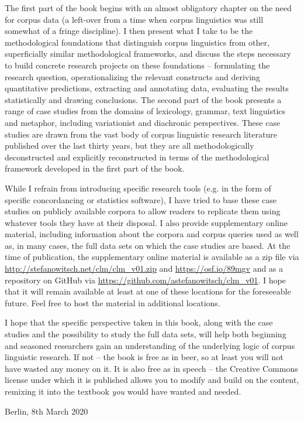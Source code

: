 The first part of the book begins with an almost obligatory chapter on the need for corpus data (a left\hyp{}over from a time when corpus linguistics was still somewhat of a fringe discipline). I then present what I take to be the methodological foundations that distinguish corpus linguistics from other, superficially similar methodological frameworks, and discuss the steps necessary to build concrete research projects on these foundations – formulating the research question, operationalizing the relevant constructs and deriving quantitative predictions, extracting and annotating data, evaluating the results statistically and drawing conclusions. The second part of the book presents a range of case studies from the domains of lexicology, grammar, text linguistics and metaphor, including variationist and diachronic perspectives. These case studies are drawn from the vast body of corpus linguistic research literature published over the last thirty years, but they are all methodologically deconstructed and explicitly reconstructed in terms of the methodological framework developed in the first part of the book.

While I refrain from introducing specific research tools (e.g. in the form of specific concordancing or statistics software), I have tried to base these case studies on publicly available corpora to allow readers to replicate them using whatever tools they have at their disposal. I also provide supplementary online material, including information about the corpora and corpus queries used as well as, in many cases, the full data sets on which the case studies are based. At the time of publication, the supplementary online material is available as a zip file via \url{http://stefanowitsch.net/clm/clm_v01.zip} and \url{https://osf.io/89mgv} and as a repository on GitHub via \url{https://github.com/astefanowitsch/clm_v01}. I hope that it will remain available at least at one of these locations for the foreseeable future. Feel free to host the material in additional locations.

I hope that the specific perspective taken in this book, along with the case studies and the possibility to study the full data sets, will help both beginning and seasoned researchers gain an understanding of the underlying logic of corpus linguistic research. If not -- the book is free as in beer, so at least you will not have wasted any money on it. It is also free as in speech -- the Creative Commons license under which it is published allows you to modify and build on the content, remixing it into the textbook \emph{you} would have wanted and needed.

\begin{flushright}
Berlin, 8th March 2020
\end{flushright}
